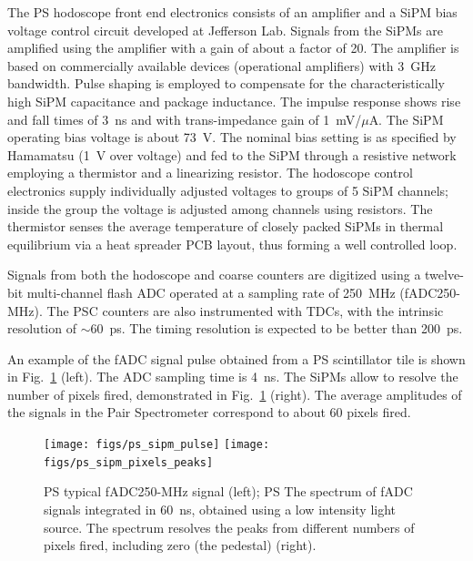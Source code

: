 The PS hodoscope front end electronics consists of an amplifier and a
SiPM bias voltage control circuit developed at Jefferson Lab. Signals
from the SiPMs are amplified using the amplifier with a gain of about
a factor of 20.  The amplifier is based on commercially available
devices (operational amplifiers) with 3~GHz bandwidth.  Pulse shaping
is employed to compensate for the characteristically high SiPM
capacitance and package inductance. The impulse response shows rise
and fall times of 3~ns and with trans-impedance gain of 1~mV/$\mu$A.  
The SiPM operating bias voltage is about 73~V. The
nominal bias setting is as specified by Hamamatsu (1~V over voltage)
and fed to the SiPM through a resistive network employing a thermistor
and a linearizing resistor. The hodoscope control electronics supply
individually adjusted voltages to groups of 5 SiPM channels; inside
the group the voltage is adjusted among channels using resistors. The
thermistor senses the average temperature of closely packed SiPMs in
thermal equilibrium via a heat spreader PCB layout, thus forming a
well controlled loop. 

Signals from both the hodoscope and coarse counters are digitized
using a twelve-bit multi-channel flash ADC operated at a sampling rate
of 250~MHz (fADC250-MHz). The PSC counters are also instrumented with
TDCs, with the intrinsic resolution of $\sim$60~ps.  The timing resolution
is expected to be better than 200~ps. 

An example of the fADC signal pulse obtained from a PS scintillator
tile is shown in Fig.~\ref{fig:beam:ps-signals} (left).  The ADC
sampling time is 4~ns. The SiPMs allow to resolve the number of pixels
fired, demonstrated in Fig.~\ref{fig:beam:ps-signals} (right). The
average amplitudes of the signals in the Pair Spectrometer correspond
to about 60 pixels fired.


\begin{figure}[h]
\begin{center}
   \texttt{[image: figs/ps\_sipm\_pulse]}\hspace{0.05\linewidth}%
   \texttt{[image: figs/ps\_sipm\_pixels\_peaks]}
\end{center}
\caption{PS typical fADC250-MHz signal (left); 
         PS The spectrum of fADC signals integrated in 60~ns, obtained using a low intensity light source. 
         The spectrum
         resolves the peaks from different numbers of pixels fired,
         including zero (the pedestal) (right).
        }
\label{fig:beam:ps-signals} 
\end{figure}





